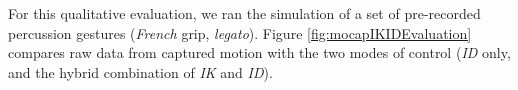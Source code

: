 
 


For this qualitative evaluation, we ran the simulation of a set of pre-recorded percussion gestures (\emph{French} grip, \emph{legato}). Figure \ref{fig:mocapIKIDEvaluation} compares raw data from captured motion with the two modes of control (\emph{ID} only, and the hybrid combination of \emph{IK} and \emph{ID}).\\

